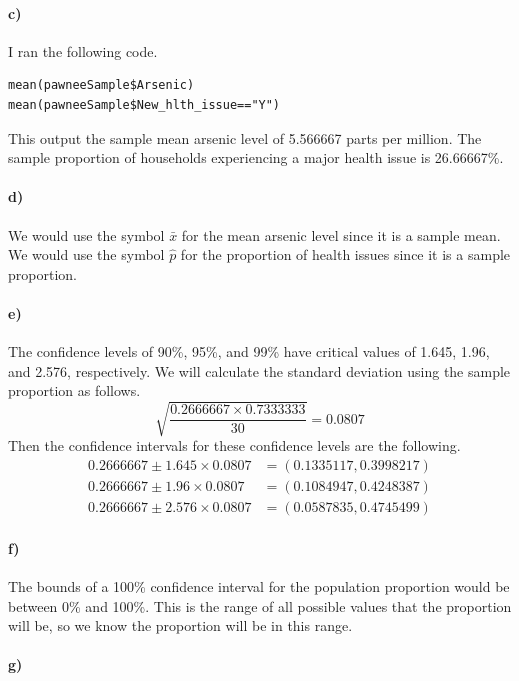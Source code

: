 \documentclass[12pt]{article}
\begin{document}
\paragraph{c)}

I ran the following code.
\begin{verbatim}
mean(pawneeSample$Arsenic)
mean(pawneeSample$New_hlth_issue=="Y")
\end{verbatim}
This output the sample mean arsenic level of 5.566667 parts per million. The sample proportion of
households experiencing a major health issue is 26.66667\%.

\paragraph{d)}

We would use the symbol \(\bar{x}\) for the mean arsenic level since it is a sample mean. We would use
the symbol \(\hat{p}\) for the proportion of health issues since it is a sample proportion.

\paragraph{e)}

The confidence levels of 90\%, 95\%, and 99\% have critical values of 1.645, 1.96, and 2.576, respectively.
We will calculate the standard deviation using the sample proportion as follows.
\[\sqrt{\frac{0.2666667\times0.7333333}{30}}=0.0807\]
Then the confidence intervals for these confidence levels are the following.
\begin{align*}
    0.2666667\pm1.645\times0.0807&=(0.1335117,0.3998217)\\
    0.2666667\pm1.96\times0.0807&=(0.1084947,0.4248387)\\
    0.2666667\pm2.576\times0.0807&=(0.0587835,0.4745499)
\end{align*}

\paragraph{f)}

The bounds of a 100\% confidence interval for the population proportion would be between
0\% and 100\%. This is the range of all possible values that the proportion will be, so we
know the proportion will be in this range.

\paragraph{g)}
\end{document}
